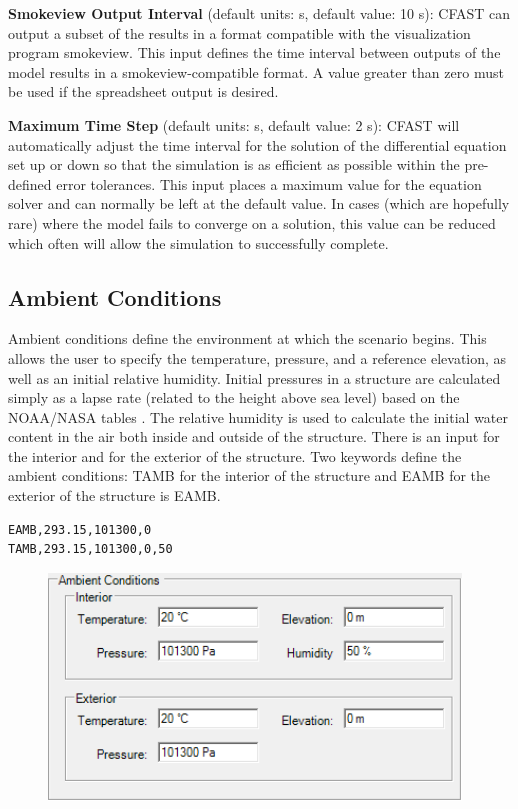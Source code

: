 \textbf{Smokeview Output Interval} (default units: s, default value: 10 s): CFAST can output a subset of the results in a format compatible with the visualization program smokeview. This input defines the time interval between outputs of the model results in a smokeview-compatible format.  A value greater than zero must be used if the spreadsheet output is desired.

\textbf{Maximum Time Step} (default units: s, default value: 2 s): CFAST will automatically adjust the time interval for the solution of the differential equation set up or down so that the simulation is as efficient as possible within the pre-defined error tolerances. This input places a maximum value for the equation solver and can normally be left at the default value. In cases (which are hopefully rare) where the model fails to converge on a solution, this value can be reduced which often will allow the simulation to successfully complete.

\subsection{Ambient Conditions}

Ambient conditions define the environment at which the scenario begins. This allows the user to specify the temperature, pressure, and a reference elevation, as well as an initial relative humidity.  Initial pressures in a structure are calculated simply as a lapse rate (related to the height above sea level) based on the NOAA/NASA tables \cite{GPO:Atmosphere}. The relative humidity is used to calculate the initial water content in the air both inside and outside of the structure.  There is an input for the interior and for the exterior of the structure.  Two keywords define the ambient conditions: TAMB for the interior of the structure and EAMB for the exterior of the structure is EAMB.

\begin{lstlisting}
EAMB,293.15,101300,0
TAMB,293.15,101300,0,50
\end{lstlisting}

\begin{figure}[h!]
\begin{center}
\includegraphics[width=4.313in]{FIGURES/Input_File/Ambient_Conditions}
\end{center}
\end{figure}

